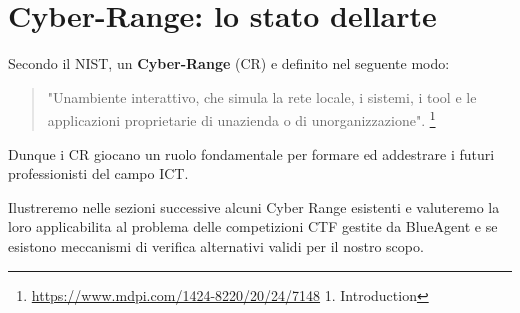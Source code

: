 \section{Cyber-Range: lo stato
dell\textquotesingle arte}\label{cyber-range-lo-stato-dellarte}

Secondo il NIST, un \textbf{Cyber-Range} (CR) e\textquotesingle{}
definito nel seguente modo:

\begin{quote}
"Un\textquotesingle ambiente interattivo, che simula la rete locale, i
sistemi, i tool e le applicazioni proprietarie di
un\textquotesingle azienda o di un\textquotesingle organizzazione".
\footnote{\label{fn:ref_3}\url{https://www.mdpi.com/1424-8220/20/24/7148} 1.
  Introduction}
\end{quote}

Dunque i CR giocano un ruolo fondamentale per formare ed addestrare i
futuri professionisti del campo ICT.

Ilustreremo nelle sezioni successive alcuni Cyber Range esistenti e
valuteremo la loro applicabilita al problema delle competizioni CTF
gestite da BlueAgent e se esistono meccanismi di verifica alternativi
validi per il nostro scopo.
